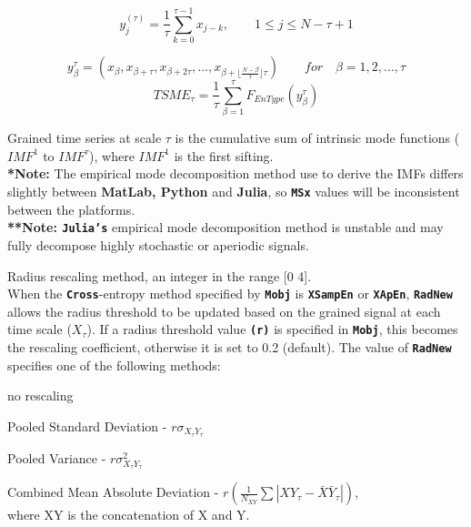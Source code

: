 \documentclass[12pt, a4paper, titlepage, openany]{book}
\begin{document}
\begin{description}[labelsep=1cm, labelwidth=2cm, nosep, style=multiline,leftmargin=3cm]
\begin{description}[labelsep=8em, labelwidth=10em, nosep,style=multiline,leftmargin=3cm]
	\item[\texttt{"modified"}]	
	\[y^{(\tau)}_{j} = \frac{1}{\tau} \sum^{\tau-1}_{k=0} x_{j-k},	\qquad  1\leq j\leq N-\tau+1 \]		
	\item[\texttt{"timeshift"}] \cite{MS10}
	\[y^{\tau}_{\beta} = (x_{\beta}, x_{\beta+\tau}, x_{\beta+2\tau}, ... ,
	 x_{\beta+\lfloor\frac{N-\beta}{\tau}\rfloor \tau})  \qquad for \quad \beta  = 1, 2, ..., \tau \]
	\[TSME_{\tau} = \frac{1}{\tau}\sum^{\tau}_{\beta=1} F_{EnType}(y^{\tau}_{\beta}) \]
	\item[\texttt{"imf"}]	Grained time series at scale $ \tau $ is the cumulative sum of 							intrinsic mode 	functions ($ IMF^1 $ to $ IMF^\tau $), where $ IMF^1 $ is the first sifting. \cite{MS6}\\
		\textbf{*Note:} The empirical mode decomposition method use to derive the IMFs 									differs slightly between \textbf{MatLab, Python} and \textbf{Julia}, so 						\textbf{\texttt{MSx}} values will be inconsistent between the platforms. \\						\textbf{**Note: \texttt{Julia's}} empirical mode decomposition method is 												unstable and may fully decompose highly stochastic or aperiodic signals.\\
	\end{description}
\item[\texttt{RadNew}]			Radius rescaling method, an integer in the range [0 4].\\
				 When the \texttt{\textbf{Cross}}-entropy method specified by \texttt{\textbf{Mobj}} is \texttt{\textbf{XSampEn}} or \texttt{\textbf{XApEn}}, \texttt{\textbf{RadNew}} allows the radius threshold to be updated based on the grained signal at each time scale ($X_\tau$). If a radius threshold value \texttt{\textbf{(r)}} is specified in \texttt{\textbf{Mobj}},  this becomes the rescaling coefficient, otherwise it is set to 0.2 (default). The value of \texttt{\textbf{RadNew}} specifies one of the following methods:
	\begin{description}[labelsep=5em, labelwidth=4em, nosep,style=multiline,leftmargin=2cm]
		\item[0]	no rescaling
		\item[1]    Pooled Standard Deviation          - $r\sigma_{X_{\tau}Y_{\tau}}$
        \item[2]    Pooled Variance                    - $r\sigma_{X_{\tau}Y_{\tau}}^2$
        \item[3]    Combined Mean Absolute Deviation     - $r(\frac{1}{N_{XY}} \sum |XY_{\tau} - \bar{X}\bar{Y}_{\tau}|),$ \\ where XY is the concatenation of X and Y.

\end{description}
\end{description}
\end{document}
